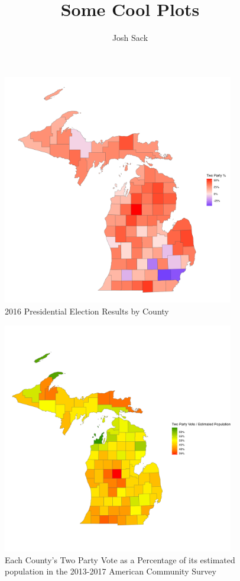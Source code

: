 \documentclass[11pt]{article}
\title{Some Cool Plots}
\author{Josh Sack}
\begin{document}
\maketitle 
\listoffigures
\begin{figure}
    \centering 
    \includegraphics[width=0.9\textwidth]{plots/county-results.png}
    \caption{2016 Presidential Election Results by County}
    \label{fig:2016-results}
\end{figure}
\begin{figure}
    \centering
    \includegraphics[width=0.9\textwidth]{plots/turnout.png}
    \caption{Each County's Two Party Vote as a Percentage of its estimated population in the 2013-2017 American Community Survey}
    \label{fig:turnout}
\end{figure}
\end{document}
